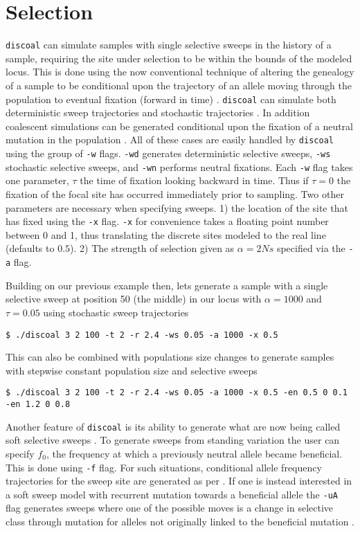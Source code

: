 \documentclass[12pt]{article}
\begin{document}
\section*{Selection}
\texttt{discoal} can simulate samples with single selective sweeps in the history of a sample, requiring the site under selection to be within the bounds of the modeled locus. This is done using the now conventional technique of altering the genealogy of a sample to be conditional upon the trajectory of an allele moving through the population to eventual fixation (forward in time) \cite{Bravermanetal1995,Kim:2002wd}. \texttt{discoal} can simulate both deterministic sweep trajectories \cite{Bravermanetal1995,Kim:2002wd} and stochastic trajectories \cite{Coop:2004pj,Przeworskietal2005}. In addition coalescent simulations can be generated conditional upon the fixation of a neutral mutation in the population \cite{Tajima:1990fx}. All of these cases are easily handled by \texttt{discoal} using the group of \texttt{-w} flags. \texttt{-wd} generates deterministic selective sweeps, \texttt{-ws} stochastic selective sweeps, and \texttt{-wn} performs neutral fixations. Each \texttt{-w} flag takes one parameter, $\tau$ the time of fixation looking backward in time. Thus if $\tau = 0$ the fixation of the focal site has occurred immediately prior to sampling. Two other parameters are necessary when specifying sweeps. 1) the location of the site that has fixed using the \texttt{-x} flag. \texttt{-x} for convenience takes a floating point number between 0 and 1, thus translating the discrete sites modeled to the real line (defaults to $0.5$). 2) The strength of selection given as $\alpha=2Ns$ specified via the \texttt{-a} flag.

 Building on our previous example then, lets generate a sample with a single selective sweep at position 50 (the middle) in our locus with $\alpha=1000$ and $\tau=0.05$ using stochastic sweep trajectories
\begin{verbatim}
$ ./discoal 3 2 100 -t 2 -r 2.4 -ws 0.05 -a 1000 -x 0.5
\end{verbatim}

This can also be combined with  populations size changes to generate samples with stepwise constant population size and selective sweeps
\begin{verbatim}
$ ./discoal 3 2 100 -t 2 -r 2.4 -ws 0.05 -a 1000 -x 0.5 -en 0.5 0 0.1 -en 1.2 0 0.8
\end{verbatim}

Another feature of \texttt{discoal} is its ability to generate what are now being called soft selective sweeps \cite{HermissonPennings2005,Przeworskietal2005}. To generate sweeps from standing variation the user can specify $f_0$, the frequency at which a previously neutral allele became beneficial. This is done using \texttt{-f} flag. For such situations, conditional allele frequency trajectories for the sweep site are generated as per \cite{Przeworskietal2005}. If one is instead interested in a soft sweep model with recurrent mutation towards a beneficial allele the \texttt{-uA} flag generates sweeps where one of the possible moves is a change in selective class through mutation for alleles not originally linked to the beneficial mutation \cite{PenningsHermisson2006}. 
\end{document}
